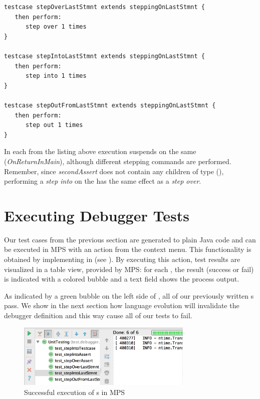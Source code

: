 \begin{lstlisting}[language=testingDSL,
caption=Test stepping commands on last \ic{Statement} in \ic{Testcase}] 
testcase stepOverLastStmnt extends steppingOnLastStmnt { 
   then perform:                         
      step over 1 times                            
}

testcase stepIntoLastStmnt extends steppingOnLastStmnt {            
   then perform:                         
      step into 1 times                            
}

testcase stepOutFromLastStmnt extends steppingOnLastStmnt {            
   then perform:                         
      step out 1 times                            
}
\end{lstlisting}		

In each  from the listing above execution suspends on the
same  (\emph{OnReturnInMain}), although different stepping
commands are performed. Remember, since \emph{secondAssert} does not contain
any children of type  (\eg {}), performing a
\emph{step into} on the  has the same effect as
a \emph{step over}.

\section{Executing Debugger Tests}

Our test cases from the previous section are generated to plain Java code and
can be executed in \ac{MPS} with an action from the
context menu. This functionality is obtained by implementing  in
 (see ).
By executing this action, test results are visualized in a table view, provided
by \ac{MPS}: for each , the result (success or
fail) is indicated with a colored bubble and a text field shows the
process output.

As indicated by a green bubble on the left side of , all
of our previously written s pass. 
We show in the next section how language evolution will invalidate the debugger
definition and this way cause all of our tests to fail.

\begin{figure}[h]
	\vspace{-2mm}
	\centering
    \includegraphics[width=8.4cm]{./figures/debuggerTestExec.png} 
    \vspace{-3mm}
	\caption{Successful execution of s in \ac{MPS}}
	\label{fig:TestExecution1}
	\vspace{-3mm}
\end{figure}